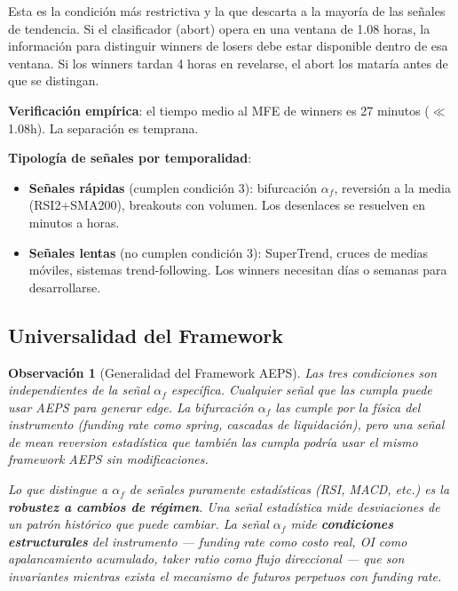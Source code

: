 \documentclass[11pt,a4paper]{article}
\newtheorem{remark}{Observaci\'on}[section]
\newcommand{\af}{\alpha_f}
\begin{document}
Esta es la condici\'on m\'as restrictiva y la que descarta a la
mayor\'ia de las se\~nales de tendencia. Si el clasificador (abort)
opera en una ventana de 1.08 horas, la informaci\'on para
distinguir winners de losers debe estar disponible dentro de esa
ventana. Si los winners tardan 4 horas en revelarse, el abort los
matar\'ia antes de que se distingan.

\textbf{Verificaci\'on emp\'irica}: el tiempo medio al MFE de
winners es 27 minutos ($\ll$ 1.08h). La separaci\'on es temprana.

\textbf{Tipolog\'ia de se\~nales por temporalidad}:
\begin{itemize}[leftmargin=1.5em]
\item \textbf{Se\~nales r\'apidas} (cumplen condici\'on 3):
  bifurcaci\'on $\af$, reversi\'on a la media (RSI2+SMA200),
  breakouts con volumen. Los desenlaces se resuelven en minutos
  a horas.
\item \textbf{Se\~nales lentas} (no cumplen condici\'on 3):
  SuperTrend, cruces de medias m\'oviles, sistemas trend-following.
  Los winners necesitan d\'ias o semanas para desarrollarse.
\end{itemize}


\subsection{Universalidad del Framework}

\begin{remark}[Generalidad del Framework AEPS]
Las tres condiciones son independientes de la se\~nal $\af$
espec\'ifica. Cualquier se\~nal que las cumpla puede usar AEPS
para generar edge. La bifurcaci\'on $\af$ las cumple por la
f\'isica del instrumento (funding rate como spring, cascadas de
liquidaci\'on), pero una se\~nal de mean reversion estad\'istica
que tambi\'en las cumpla podr\'ia usar el mismo framework AEPS
sin modificaciones.

Lo que distingue a $\af$ de se\~nales puramente estad\'isticas
(RSI, MACD, etc.) es la \textbf{robustez a cambios de r\'egimen}.
Una se\~nal estad\'istica mide desviaciones de un patr\'on hist\'orico
que puede cambiar. La se\~nal $\af$ mide \textbf{condiciones
estructurales} del instrumento --- funding rate como costo real,
OI como apalancamiento acumulado, taker ratio como flujo
direccional --- que son invariantes mientras exista el mecanismo
de futuros perpetuos con funding rate.
\end{remark}
\end{document}
